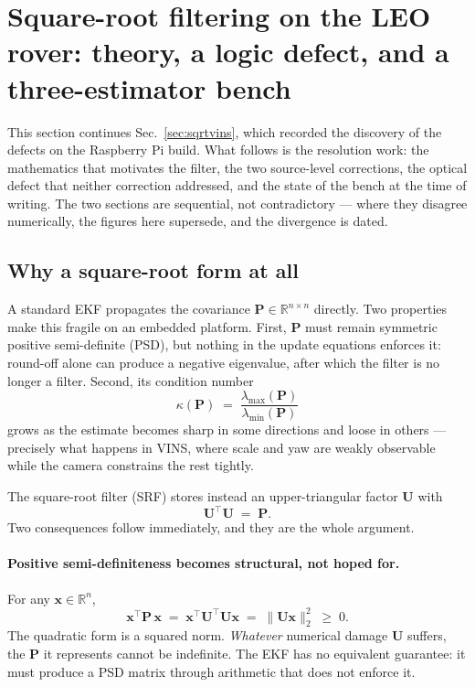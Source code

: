 \section{Square-root filtering on the LEO rover: theory, a logic defect, and a three-estimator bench}
\label{sec:sqrtvinsint}

This section continues Sec.~\ref{sec:sqrtvins}, which recorded the discovery
of the defects on the Raspberry Pi build. What follows is the resolution work:
the mathematics that motivates the filter, the two source-level corrections,
the optical defect that neither correction addressed, and the state of the
bench at the time of writing. The two sections are sequential, not
contradictory --- where they disagree numerically, the figures here supersede,
and the divergence is dated.

\subsection{Why a square-root form at all}
\label{ssec:sqrtwhy}

A standard EKF propagates the covariance $\mathbf{P}\in\mathbb{R}^{n\times n}$
directly. Two properties make this fragile on an embedded platform. First,
$\mathbf{P}$ must remain symmetric positive semi-definite (PSD), but nothing in
the update equations enforces it: round-off alone can produce a negative
eigenvalue, after which the filter is no longer a filter. Second, its condition
number
%
\begin{equation}
  \kappa(\mathbf{P}) \;=\; \frac{\lambda_{\max}(\mathbf{P})}{\lambda_{\min}(\mathbf{P})}
  \label{eq:cond}
\end{equation}
%
grows as the estimate becomes sharp in some directions and loose in others ---
precisely what happens in VINS, where scale and yaw are weakly observable while
the camera constrains the rest tightly.

The square-root filter (SRF) stores instead an upper-triangular factor
$\mathbf{U}$ with
%
\begin{equation}
  \mathbf{U}^{\top}\mathbf{U} \;=\; \mathbf{P}.
  \label{eq:chol}
\end{equation}
%
Two consequences follow immediately, and they are the whole argument.

\paragraph{Positive semi-definiteness becomes structural, not hoped for.}
For any $\mathbf{x}\in\mathbb{R}^{n}$,
%
\begin{equation}
  \mathbf{x}^{\top}\mathbf{P}\,\mathbf{x}
  \;=\; \mathbf{x}^{\top}\mathbf{U}^{\top}\mathbf{U}\mathbf{x}
  \;=\; \lVert \mathbf{U}\mathbf{x} \rVert_{2}^{2} \;\geq\; 0 .
  \label{eq:psd}
\end{equation}
%
The quadratic form is a squared norm. \emph{Whatever} numerical damage
$\mathbf{U}$ suffers, the $\mathbf{P}$ it represents cannot be indefinite. The
EKF has no equivalent guarantee: it must produce a PSD matrix through
arithmetic that does not enforce it.


